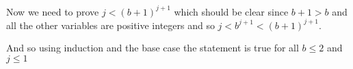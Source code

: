 \documentclass{article}
\begin{document}
Now we need to prove $j<(b+1)^{j+1}$ which should be clear since $b+1>b$ and all the other variables are positive integers and so $j<b^{j+1}<(b+1)^{j+1}$.

And so using induction and the base case the statement is true for all $b\le 2$ and $j\le 1$

%
\end{document}
